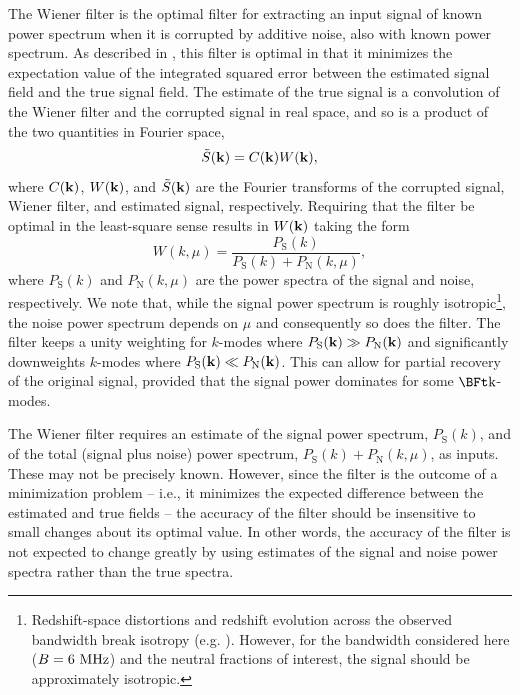 The Wiener filter is the optimal filter for extracting
an input signal of known power spectrum when it is corrupted by additive noise,
also with known power spectrum. 
As described in \citet{NRecipes},
this filter is optimal in that it minimizes the expectation value of the integrated squared
error between the estimated signal field and the true signal
field. The estimate of the true signal is a convolution of the Wiener
filter and the corrupted signal in real space, and so is a product of
the two quantities in Fourier space,
\begin{equation}
\tilde{S}({\bf k}) = C({\bf k})W({\bf
  k}), \label{eq:FourierConvolution}
\end{equation}
where $C({\bf k})$, $W({\bf k})$, and $\tilde{S}({\bf k})$ are the
Fourier transforms of the corrupted signal, Wiener filter, and
estimated signal, respectively. Requiring that the filter be optimal
in the least-square sense results in $W({\bf k})$ taking the form
\begin{equation}  W(k,\mu) = \frac{P_{\text{S}}(k)}{P_{\text{S}}(k) + P_{\text{N}}(k,\mu)}, \label{eq:WienerFilter} \end{equation}
where $P_{\text{S}}(k)$ and $P_{\text{N}}(k,\mu)$ are the power
spectra of the signal and noise, respectively. We note that, while the
signal power spectrum is roughly isotropic\footnote{Redshift-space distortions
and redshift evolution across the observed bandwidth break isotropy (e.g. \citealt{Datta:2011hv}). However,
for the bandwidth considered here ($B = 6 \ \text{MHz}$) and the neutral fractions of interest, the
signal should be approximately isotropic.}, the noise power spectrum depends on $\mu$ and
consequently so does the filter. The filter keeps a unity weighting
for $k$-modes where $P_{\text{S}}({\bf k}) \gg P_{\text{N}}({\bf k})$
and significantly downweights $k$-modes where $P_{\text{S}}({\bf k})
\ll P_{\text{N}}({\bf k})$. This can allow for partial recovery of
the original signal, provided that the signal power dominates for some
$\k$-modes.

The Wiener filter requires an estimate of the signal power spectrum, $P_{\text{S}}(k)$, and of
the total (signal plus noise) power spectrum, $P_{\text{S}}(k) + P_{\text{N}}(k, \mu)$, as inputs. These
may not be precisely known. However, since the filter is the outcome of a
minimization problem -- i.e., it minimizes the expected difference
between the estimated and true fields -- the accuracy of the filter
should be insensitive to small changes about its optimal value. In
other words, the accuracy of the filter is not expected to
change greatly by using estimates of the signal and noise power spectra rather than
the true spectra. 

